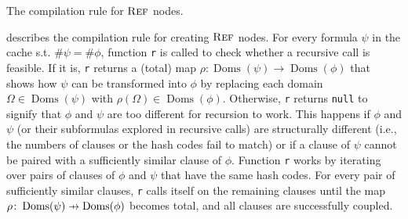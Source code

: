 \documentclass{article}
\theoremstyle{definition}
\theoremstyle{remark}
\newcommand\pfun{\mathrel{\ooalign{\hfil$\mapstochar\mkern5mu$\hfil\cr$\to$\cr}}}
\DeclareMathOperator{\Reff}{\textsc{Ref}}
\DeclareMathOperator{\Doms}{Doms}
\begin{document}
\begin{algorithm}[t]
  \caption{The compilation rule for $\Reff$ nodes.}\label{alg:trycache}

  \ForEach{formula and node $(\psi, v) \in C(\#\phi)$}{\label{line:selectformula}
    $\rho \gets \identifyRecursion{$\phi$, $\psi$}$\;
    \lIf{$\rho \ne {\normalfont \texttt{null}}$}{\Return{$\{\, (\Reff_\rho(v), \langle\rangle) \,\}$}}\label{line:rho}
  }
  \Return{$\emptyset$}\;

\end{algorithm}

 describes the compilation rule for creating $\Reff$ nodes.
For every formula $\psi$ in the cache s.t. $\#\psi = \#\phi$, function
\texttt{r} is called to check whether a recursive call is feasible. If it is,
\texttt{r} returns a (total) map $\rho\colon \Doms(\psi) \to \Doms(\phi)$ that
shows how $\psi$ can be transformed into $\phi$ by replacing each domain
$\Omega \in \Doms(\psi)$ with $\rho(\Omega) \in \Doms(\phi)$. Otherwise,
\texttt{r} returns \texttt{null} to signify that $\phi$ and $\psi$ are too
different for recursion to work. This happens if $\phi$ and $\psi$ (or their
subformulas explored in recursive calls) are structurally different (i.e., the
numbers of clauses or the hash codes fail to match) or if a clause of $\psi$
cannot be paired with a sufficiently similar clause of $\phi$. Function
\texttt{r} works by iterating over pairs of clauses of $\phi$ and $\psi$ that
have the same hash codes. For every pair of sufficiently similar clauses,
\texttt{r} calls itself on the remaining clauses until the map
$\rho\colon \Doms(\psi) \pfun \Doms(\phi)$ becomes total, and all clauses are
successfully coupled.
\end{document}
